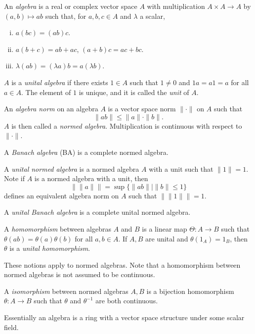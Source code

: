 \documentclass[12pt]{article}
\begin{document}
\begin{definition}
	An \emph{algebra} is a real or complex vector space $A$ with multiplication $A \times A \to A$ by $(a, b) \mapsto ab$ such that, for $a, b, c \in A$ and $\lambda$ a scalar,
	\begin{enumerate}[(i)]
		\item $a(bc) = (ab)c$.
		\item $a(b + c) = ab + ac$, $(a + b)c = ac + bc$.
		\item $\lambda(ab) = (\lambda a) b = a(\lambda b)$.
	\end{enumerate}
	$A$ is a \emph{unital algebra} if there exists $1 \in A$ such that $1 \neq 0$ and $1a = a1 = a$ for all $a \in A$. The element of $1$ is unique, and it is called the \emph{unit} of $A$.

	An \emph{algebra norm} on an algebra $A$ is a vector space norm $\|\cdot\|$ on $A$ such that
	\[
	\|ab\| \leq \|a\| \cdot \|b\|.
	\]
	$A$ is then called a \emph{normed algebra}. Multiplication is continuous with respect to $\|\cdot\|$.

	A \emph{Banach algebra} (BA) is a complete normed algebra.

	A \emph{unital normed algebra} is a normed algebra $A$ with a unit such that $\|1\| = 1$. Note if $A$ is a normed algebra with a unit, then
	\[
		\|\|a\|\| = \sup \{ \|a b\| \mid \|b\| \leq 1\}
	\]
	defines an equivalent algebra norm on $A$ such that $\|\|1\|\| = 1$.

	A \emph{unital Banach algebra} is a complete unital normed algebra.

	A \emph{homomorphism} between algebras $A$ and $B$ is a linear map $\Theta : A \to B$ such that $\theta(ab) = \theta(a) \theta(b)$ for all $a, b \in A$. If $A, B$ are unital and $\theta(1_A) = 1_B$, then $\theta$ is a \emph{unital homomorphism}.

	These notions apply to normed algebras. Note that a homomorphism between normed algebras is not assumed to be continuous.

	A \emph{isomorphism} between normed algebras $A, B$ is a bijection homomorphism $\theta : A \to B$ such that $\theta$ and $\theta^{-1}$ are both continuous.
\end{definition}

Essentially an algebra is a ring with a vector space structure under some scalar field.
\end{document}
